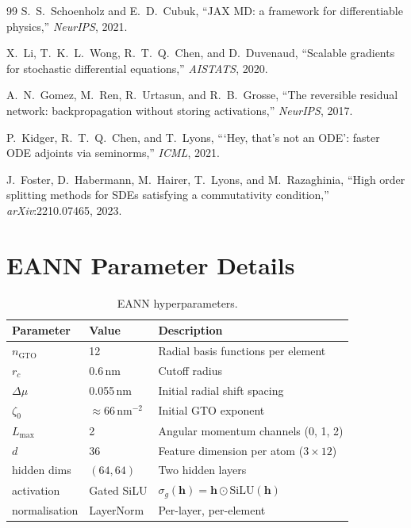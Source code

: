 \documentclass{article}
\begin{document}
\begin{thebibliography}{99}
S.\ S.\ Schoenholz and E.\ D.\ Cubuk,
``JAX MD: a framework for differentiable physics,''
\textit{NeurIPS}, 2021.

X.\ Li, T.\ K.\ L.\ Wong, R.\ T.\ Q.\ Chen, and D.\ Duvenaud,
``Scalable gradients for stochastic differential equations,''
\textit{AISTATS}, 2020.

A.\ N.\ Gomez, M.\ Ren, R.\ Urtasun, and R.\ B.\ Grosse,
``The reversible residual network: backpropagation without storing
activations,'' \textit{NeurIPS}, 2017.

P.\ Kidger, R.\ T.\ Q.\ Chen, and T.\ Lyons,
```Hey, that's not an ODE': faster ODE adjoints via seminorms,''
\textit{ICML}, 2021.

J.\ Foster, D.\ Habermann, M.\ Hairer, T.\ Lyons, and M.\ Razaghinia,
``High order splitting methods for SDEs satisfying a commutativity
condition,'' \textit{arXiv}:2210.07465, 2023.

\end{thebibliography}

\appendix

\section{EANN Parameter Details}
\label{app:eann}

\begin{table}[h]
\centering
\caption{EANN hyperparameters.}
\begin{tabular}{lll}
\toprule
Parameter & Value & Description \\
\midrule
$n_\mathrm{GTO}$     & 12               & Radial basis functions per element \\
$r_c$                & 0.6\,nm          & Cutoff radius \\
$\Delta\mu$          & 0.055\,nm        & Initial radial shift spacing \\
$\zeta_0$            & ${\approx}66$\,nm$^{-2}$ & Initial GTO exponent \\
$L_\mathrm{max}$     & 2                & Angular momentum channels (0, 1, 2) \\
$d$                  & 36               & Feature dimension per atom ($3 \times 12$) \\
hidden dims          & $(64, 64)$       & Two hidden layers \\
activation           & Gated SiLU       & $\sigma_g(\bm{h}) = \bm{h}\odot\mathrm{SiLU}(\bm{h})$ \\
normalisation        & LayerNorm        & Per-layer, per-element \\
\bottomrule
\end{tabular}
\end{table}
\end{document}
